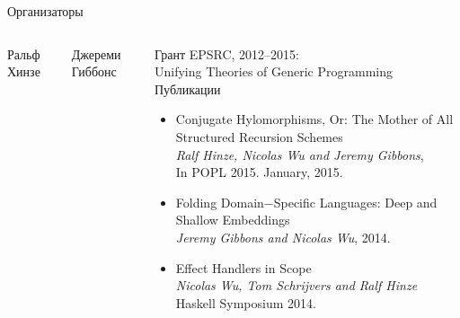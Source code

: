 \begin{frame}
\titlepage
\end{frame}

\begin{frame}{Организаторы}

\begin{columns}
  \column{3cm}
\vspace{-1cm}

\begin{block}{Ральф Хинзе}
\end{block}

\vspace{-2mm}

\begin{block}{Джереми Гиббонс}
\end{block}

  \column{7.5cm}
\vspace{-1mm}
\begin{block}{Грант EPSRC, 2012–2015:\\Unifying Theories of Generic Programming}
Публикации %
\begin{itemize}
  \item
{}%
{Conjugate Hylomorphisms‚ Or: The Mother of All Structured Recursion Schemes}\\
\textit{Ralf Hinze‚ Nicolas Wu and Jeremy Gibbons},\\
In POPL 2015. January, 2015.

  \item
{}%
{Folding Domain−Specific Languages: Deep and Shallow Embeddings}\\
\textit{Jeremy Gibbons and Nicolas Wu}, 2014.\\

  \item
{}%
{Effect Handlers in Scope}\\
\textit{Nicolas Wu‚ Tom Schrijvers and Ralf Hinze}\\
Haskell Symposium 2014.
\end{itemize}
\end{block}

\vspace{2cm}

\end{columns}

\end{frame}
